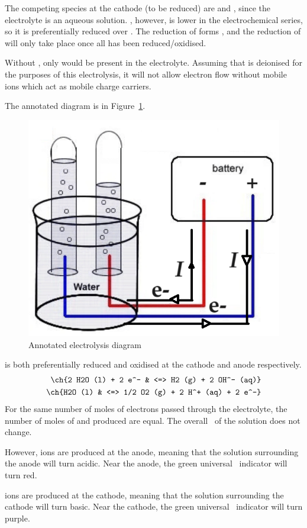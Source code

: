 \documentclass[12pt, a4paper, twoside]{pancake-book}
\begin{document}
The competing species at the cathode (to be reduced) are  and , since the electrolyte
is an aqueous solution. , however, is lower in the electrochemical series,
so it is preferentially reduced over . The reduction of 
forms , and the reduction of  will only take place once
all  has been reduced/oxidised.

Without , only  would be present in the electrolyte.
Assuming that  is deionised for the purposes of this electrolysis, it
will not allow electron flow without mobile ions which act as mobile charge carriers.

The annotated diagram is in Figure~\ref{fig:nano3-ans}.

\begin{figure}[htpb]
	\centering
	\includegraphics[width=0.4\linewidth]{assets/09_electrolysis_nano3_ans.png}
	\caption{Annotated electrolysis diagram}
	\label{fig:nano3-ans}
\end{figure}

 is both preferentially reduced and oxidised at the cathode and anode
respectively.
\begin{align*}
	\ch{2 H2O (l) + 2 e^- & <=> H2 (g) + 2 OH^- (aq)}            \\
	\ch{H2O (l)           & <=> 1/2 O2 (g) + 2 H^+ (aq) + 2 e^-}
\end{align*}
For the same number of moles of electrons passed through the electrolyte, the
number of moles of  and  produced are equal. The overall \pH\
of the solution does not change.

However,  ions are produced at the anode, meaning that the solution surrounding
the anode will turn {\color{accent} acidic}. {\color{accent} Near the anode, the green universal
\pH\ indicator will turn red}.

 ions are produced at the cathode, meaning that the solution surrounding
the cathode will turn {\color{cobalt} basic}. {\color{cobalt} Near the cathode, the green universal \pH\ indicator will turn purple.}
\end{document}
